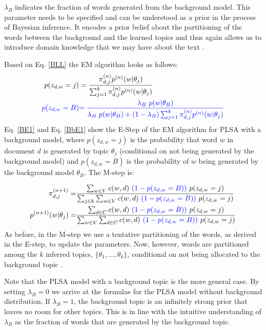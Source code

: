 \documentclass[11pt,a4paper,english,oneside]{book}
\numberwithin{equation}{chapter}
\begin{document}
$\lambda_B$ indicates the fraction of words generated from the background model. This parameter needs to be specified and can be understood as a prior in the process of Bayesian inference. It encodes a prior belief about the partitioning of the words between the background and the learned topics and thus again allows us to introduce domain knowledge that we may have about the text \citep[pp. 361, 372--376]{Zhai.2016}. 

Based on Eq. \ref{BLL} the EM algorithm looks as follows:
\begin{align}\label{BE1}
p(z_{d,w}=j)&=\frac{\pi_{d,j}^{(n)}p^{(n)}(w|\theta_j)}{\sum_{j=1}^{k}\pi_{d,j}^{(n)}p^{(n)}(w|\theta_j)}\\
\label{BbE1}
\textcolor{blue}{ p(z_{d,w}=B)} & \textcolor{blue}{ =\frac{\lambda_B \ p(w|\theta_B)}{\lambda_B \ p(w|\theta_B) + (1-\lambda_B) \sum_{j=1}^{k}\pi_{d,j}^{(n)}p^{(n)}(w|\theta_j)} }
\end{align}
Eq. \ref{BE1} and Eq. \ref{BbE1} show the E-Step of the EM algorithm for PLSA with a background model, where $p(z_{d,w}=j)$ is the probability that word $w$ in document $d$ is generated by topic $\theta_j$ (conditional on not being generated by the background model) and $p(z_{d,w}=B)$ is the probability of $w$ being generated by the background model $\theta_B$. The M-step is:

\begin{align}%
\label{BM1pi} \pi_{d,j}^{(n+1)}=&\frac{\sum_{w \in V} c(w,d) \ \textcolor{blue}{(1-p(z_{d,w}=B))}\ p(z_{d,w}=j)}{\sum_{j \in k}\sum_{w \in V}c(w,d) \ \textcolor{blue}{(1-p(z_{d,w}=B))} \ p(z_{d,w}=j)}\\
\label{BM1theta} p^{(n+1)}(w|\theta_j)=&\frac{\sum_{d \in C} c(w,d) \ \textcolor{blue}{(1-p(z_{d,w}=B))} \ p(z_{d,w}=j)}{\sum_{w \in V}\sum_{d \in C}c(w,d)\ \textcolor{blue}{(1-p(z_{d,w}=B))}\ p(z_{d,w}=j)}
\end{align}
As before, in the M-step we use a tentative partitioning of the words, as derived in the E-step, to update the parameters. Now, however, words are partitioned among the $k$ inferred topics, $\{\theta_1, ..., \theta_k\}$, conditional on not being allocated to the background topic \citep[pp. 372--376]{Zhai.2016}. 

Note that the PLSA model with a background topic is the more general case. By setting $\lambda_B=0$ we arrive at the formulae for the PLSA model without background distribution. If $\lambda_B=1$, the background topic is an infinitely strong prior that leaves no room for other topics. This is in line with the intuitive understanding of $\lambda_B$ as the fraction of words that are generated by the background topic. 
\end{document}
